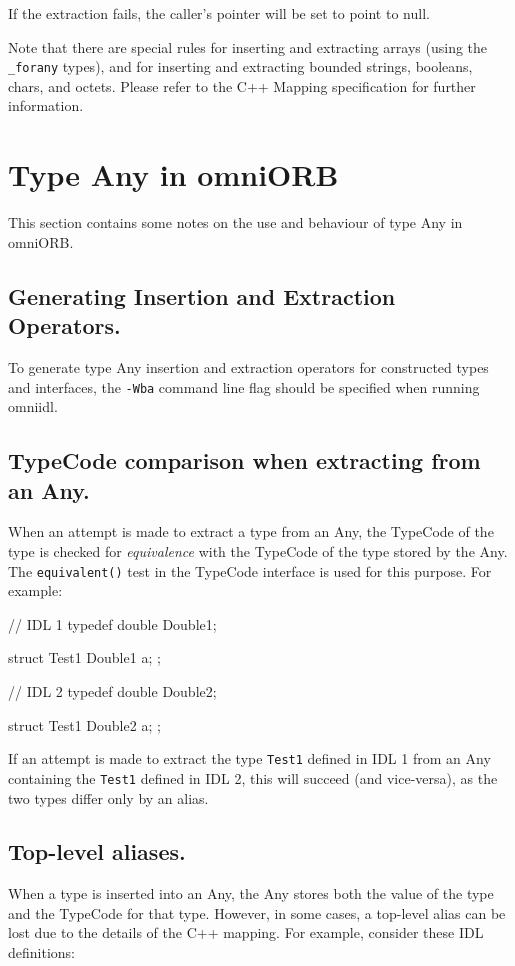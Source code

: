 \documentclass[11pt,twoside,a4paper]{book}
\newcommand{\type}[1]{\texttt{#1}}
\newcommand{\op}[1]{\texttt{#1()}}
\begin{document}
If the extraction fails, the caller's pointer will be set to point to
null.

Note that there are special rules for inserting and extracting arrays
(using the \type{\_forany} types), and for inserting and extracting
bounded strings, booleans, chars, and octets. Please refer to the C++
Mapping specification for further information.



\section{Type Any in omniORB}
\label{anyOmniORB}

This section contains some notes on the use and behaviour of type Any
in omniORB.

\subsection{Generating Insertion and Extraction Operators.}
To generate type Any insertion and extraction operators for
constructed types and interfaces, the \texttt{-Wba} command line flag
should be specified when running omniidl.

\subsection{TypeCode comparison when extracting from an Any.}
When an attempt is made to extract a type from an Any, the TypeCode of
the type is checked for \emph{equivalence} with the TypeCode of the
type stored by the Any. The \op{equivalent} test in the TypeCode
interface is used for this purpose. For example:

\begin{idllisting}
// IDL 1
typedef double Double1;

struct Test1 {
  Double1 a;
};
\end{idllisting}

\begin{idllisting}
// IDL 2
typedef double Double2;

struct Test1 {
  Double2 a;
};
\end{idllisting}
    
If an attempt is made to extract the type \type{Test1} defined in IDL
1 from an Any containing the \type{Test1} defined in IDL 2, this will
succeed (and vice-versa), as the two types differ only by an alias.

\subsection{Top-level aliases.}
When a type is inserted into an Any, the Any stores both the value of
the type and the TypeCode for that type. However, in some cases, a
top-level alias can be lost due to the details of the C++ mapping. For
example, consider these IDL definitions:
\end{document}
